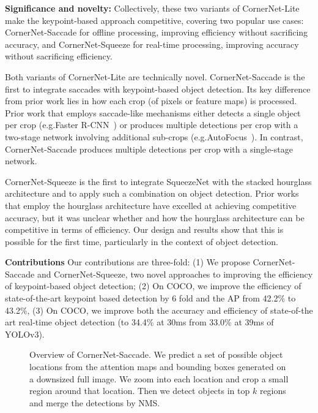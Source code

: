\documentclass{bmvc2k}
\begin{document}
\smallskip \noindent \textbf{Significance and novelty:} Collectively, these two variants of CornerNet-Lite make the keypoint-based approach competitive, covering two popular use cases: CornerNet-Saccade for offline processing, improving efficiency without sacrificing accuracy, and CornerNet-Squeeze for real-time processing, improving accuracy without sacrificing efficiency.

Both variants of CornerNet-Lite are technically novel. CornerNet-Saccade is the first to integrate saccades with keypoint-based object detection. Its key difference from prior work lies in how each crop (of pixels or feature maps) is processed. Prior work that employs saccade-like mechanisms either detects a single object per crop (e.g.\@ Faster R-CNN~\cite{ren2015faster}) or produces multiple detections per crop with a two-stage network involving additional sub-crops (e.g.\@ AutoFocus~\cite{najibi2018autofocus}). In contrast, CornerNet-Saccade produces multiple detections per crop with a single-stage network. 

CornerNet-Squeeze is the first to integrate SqueezeNet with the stacked hourglass architecture and to apply such a combination on object detection. Prior works that employ the hourglass architecture have excelled at achieving competitive accuracy, but it was unclear whether and how the hourglass architecture can be competitive in terms of efficiency. Our design and results show that this is possible for the first time, particularly in the context of object detection. 

\smallskip \noindent \textbf{Contributions} Our contributions are three-fold: (1) We propose CornerNet-Saccade and CornerNet-Squeeze, two novel approaches to improving the efficiency of keypoint-based object detection; (2) On COCO, we improve the efficiency of state-of-the-art keypoint based detection by 6 fold and the AP from 42.2\% to 43.2\%, (3) On COCO, we improve both the accuracy and efficiency of state-of-the art real-time object detection (to 34.4\% at 30ms from 33.0\% at 39ms of YOLOv3).

\begin{figure}
    \centering
    \caption{Overview of CornerNet-Saccade. We predict a set of possible object locations from the attention maps and bounding boxes generated on a downsized full image. We zoom into each location and crop a small region around that location. Then we detect objects in top $k$ regions and merge the detections by NMS.}
    \label{fig:overview}
    \vspace{-3mm}
\end{figure}
\end{document}
